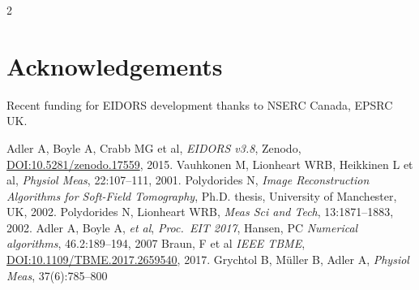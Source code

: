 \documentclass[10pt,letterpaper]{article}
\renewenvironment{thebibliography}[1]{%
    \begin{oldthebibliography}{#1}%
      \setlength{\parskip}{0ex}%
      \setlength{\itemsep}{0ex}%
  }%
  {%
    \end{oldthebibliography}%
  }
\begin{document}
\begin{multicols}{2}
\section*{Acknowledgements}
Recent funding for EIDORS development thanks to
NSERC Canada, EPSRC UK.

\footnotesize
\begin{thebibliography}{}
   Adler A, Boyle A, Crabb MG et al,
   {\em EIDORS v3.8}, Zenodo,
   \href{http://dx.doi.org/10.5281/zenodo.17559}{DOI:10.5281/zenodo.17559},
    2015.
   Vauhkonen M, Lionheart WRB, Heikkinen L et al,
   {\em  Physiol Meas}, 22:107--111, 2001.
   Polydorides N,
 {\em Image Reconstruction Algorithms for Soft-Field Tomography}, Ph.D. thesis,
   University of Manchester, UK, 2002.
   Polydorides N, Lionheart WRB,
   {\em Meas Sci and Tech}, 13:1871--1883, 2002.
   Adler A, Boyle A, {\em et al}, {\em Proc.\ EIT 2017}, 
   Hansen, PC {\em Numerical algorithms}, 46.2:189--194, 2007
   Braun, F et al {\em IEEE TBME}, \href{http://dx.doi.org/10.1109/TBME.2017.2659540}{DOI:10.1109/TBME.2017.2659540}, 2017.
   Grychtol B, M\"uller B, Adler A,
   {\em Physiol Meas}, 37(6):785--800
\end{thebibliography}
\end{multicols}
\end{document}
